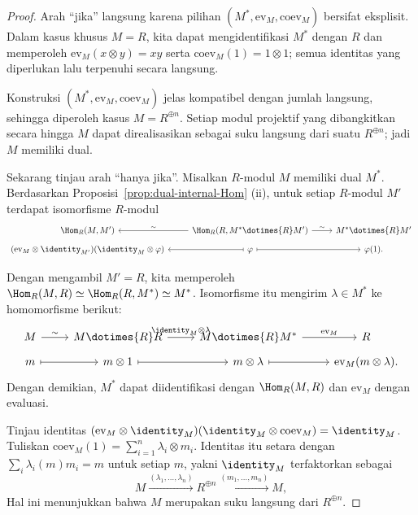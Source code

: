 \begin{proof}
	Arah ``jika'' langsung karena pilihan
	$(M^*,\mathrm{ev}_M,\mathrm{coev}_M)$ bersifat eksplisit. Dalam kasus
	khusus $M=R$, kita dapat mengidentifikasi $M^*$ dengan $R$ dan memperoleh
	$\mathrm{ev}_M(x\otimes y)=xy$ serta
	$\mathrm{coev}_M(1)=1\otimes1$; semua identitas yang diperlukan lalu
	terpenuhi secara langsung.

	Konstruksi $(M^*,\mathrm{ev}_M,\mathrm{coev}_M)$ jelas kompatibel dengan
jumlah langsung, sehingga diperoleh kasus $M=R^{\oplus n}$. Setiap modul
projektif yang dibangkitkan secara hingga $M$ dapat direalisasikan sebagai
suku langsung dari suatu $R^{\oplus n}$; jadi $M$ memiliki dual.

	Sekarang tinjau arah ``hanya jika''. Misalkan $R$-modul $M$ memiliki
dual $M^*$. Berdasarkan Proposisi~\ref{prop:dual-internal-Hom} (ii), untuk
setiap $R$-modul $M'$ terdapat isomorfisme $R$-modul
	\[\begin{tikzcd}[row sep=tiny]
		\Hom_R(M, M') & \Hom_R(R, M^* \dotimes{R} M') \arrow[l, "\sim"'] \arrow[r, "\sim"] & M^* \dotimes{R} M' \\
		(\mathrm{ev}_M \otimes \identity_{M'}) (\identity_M \otimes \varphi) & \varphi \arrow[mapsto, l] \arrow[mapsto, r] & \varphi(1).
	\end{tikzcd}\]

	Dengan mengambil $M'=R$, kita memperoleh
	$\Hom_R(M,R)\simeq\Hom_R(R,M^*)\simeq M^*$. Isomorfisme itu mengirim
$\lambda\in M^*$ ke homomorfisme berikut:
	\[\begin{tikzcd}[row sep=tiny]
		M \arrow[r, "\sim"] & M \dotimes{R} R \arrow[r, "{\identity_M \otimes \lambda}"] & M \dotimes{R} M^* \arrow[r, "{\mathrm{ev}_M}"] & R \\ 
		m \arrow[mapsto, r] & m \otimes 1 \arrow[mapsto, r] & m \otimes \lambda \arrow[mapsto, r] & \mathrm{ev}_M(m \otimes \lambda).
	\end{tikzcd}\]
	Dengan demikian, $M^*$ dapat diidentifikasi dengan $\Hom_R(M,R)$ dan
$\mathrm{ev}_M$ dengan evaluasi.

	Tinjau identitas
	$(\mathrm{ev}_M\otimes\identity_M)
	(\identity_M\otimes\mathrm{coev}_M)=\identity_M$. Tuliskan
	$\mathrm{coev}_M(1)=\sum_{i=1}^n\lambda_i\otimes m_i$. Identitas itu
	setara dengan $\sum_i\lambda_i(m)m_i=m$ untuk setiap $m$, yakni
$\identity_M$ terfaktorkan sebagai
	\[ M \xrightarrow{(\lambda_1, \ldots, \lambda_n)} R^{\oplus n} \xrightarrow{(m_1, \ldots, m_n)} M, \]
	Hal ini menunjukkan bahwa $M$ merupakan suku langsung dari
$R^{\oplus n}$.
\end{proof}

